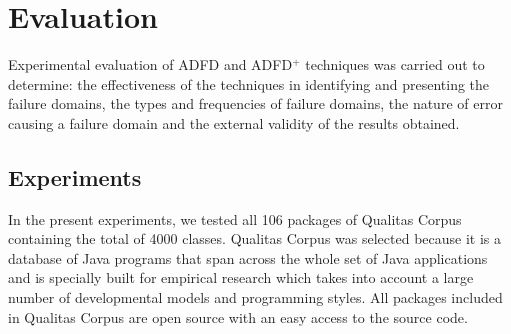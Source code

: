 \begin{enumerate}
%

%
%


\end{enumerate}




\section{Evaluation}
Experimental evaluation of ADFD and ADFD$^+$ techniques was carried out to determine: the effectiveness of the techniques in identifying and presenting the failure domains, the types and frequencies of failure domains, the nature of error causing a failure domain and the external validity of the results obtained. 


\subsection{Experiments}
In the present experiments, we tested all 106 packages of Qualitas Corpus containing the total of 4000 classes. Qualitas Corpus was selected because it is a database of Java programs that span across the whole set of Java applications and is specially built for empirical research which takes into account a large number of developmental models and programming styles. All packages included in Qualitas Corpus are open source with an easy access to the source code.

